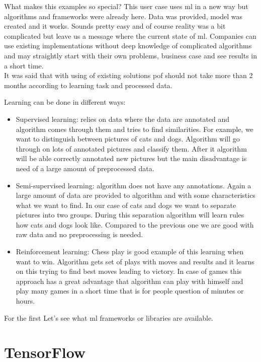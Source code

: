 \documentclass[thesis=M,english]{FITthesis}[2012/06/26]
\begin{document}
What makes this examples so special? This user case uses \acrshort{ml} in a new way but algorithms and frameworks were already here. Data was provided, model was created and it works. Sounds pretty easy and of course reality was a bit complicated but leave us a message where the current state of \acrshort{ml}. Companies can use existing implementations without deep knowledge of complicated algorithms and may straightly start with their own problems, business case and see results in a short time.\\

It was said that with using of existing solutions \acrshort{pof} should not take more than 2 months according to learning task and processed data.

Learning can be done in different ways: 
\begin{itemize}[nosep]
\item Supervised learning: relies on data where the data are annotated and algorithm comes through them and tries to find similarities. For example, we want to distinguish between pictures of cats and dogs. Algorithm will go through on lots of annotated pictures and classify them. After it algorithm will be able correctly annotated new pictures but the main disadvantage is need of a large amount of preprocessed data. 
\item Semi-supervised learning: algorithm does not have any annotations. Again a large amount of data are provided to algorithm and with some characteristics what we want to find. In our case of cats and dogs we want to separate pictures into two groups. During this separation algorithm will learn rules how cats and dogs look like. Compared to the previous one we are good with raw data and no preprocessing is needed.
\item Reinforcement learning: Chess play is good example of this learning when want to win. Algorithm gets set of plays with moves and results and it learns on this trying to find best moves leading to victory. In case of games this approach has a great advantage that algorithm can play with himself and play many games in a short time that is for people question of minutes or hours.
\end{itemize}


For the first Let's see what \acrshort{ml} frameworks or libraries are available.

\section{TensorFlow}
\end{document}

